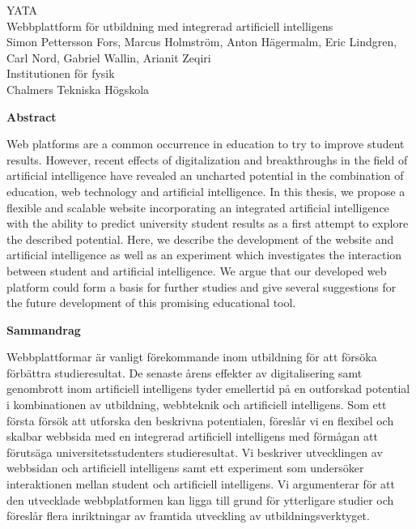 \noindent YATA\\
Webbplattform för utbildning med integrerad artificiell intelligens\\
Simon Pettersson Fors, Marcus Holmström, Anton Hägermalm, Eric Lindgren, Carl Nord, Gabriel Wallin, Arianit Zeqiri\\
Institutionen för fysik\\
Chalmers Tekniska Högskola\\


\vspace*{1cm}
\begin{flushleft}
    \Large
\noindent \textbf{Abstract}
\end{flushleft}



\noindent Web platforms are a common occurrence in education to try to improve student results. However, recent effects of digitalization and breakthroughs in the field of artificial intelligence have revealed an uncharted potential in the combination of education, web technology and artificial intelligence. In this thesis, we propose a flexible and scalable website incorporating an integrated artificial intelligence with the ability to predict university student results as a first attempt to explore the described potential. Here, we describe the development of the website and artificial intelligence as well as an experiment which investigates the interaction between student and artificial intelligence. We argue that our developed web platform could form a basis for further studies and give several suggestions for the future development of this promising educational tool. 

\vspace{2.5cm}
\begin{flushleft}
    \Large
\noindent \textbf{Sammandrag}
\end{flushleft}


\noindent Webbplattformar är vanligt förekommande inom utbildning för att försöka förbättra studieresultat. De senaste årens effekter av digitalisering samt genombrott inom artificiell intelligens tyder emellertid på en outforskad potential i kombinationen av utbildning, webbteknik och artificiell intelligens. Som ett första försök att utforska den beskrivna potentialen, föreslår vi en flexibel och skalbar webbsida med en integrerad artificiell intelligens med förmågan att förutsäga universitetsstudenters  studieresultat. Vi beskriver utvecklingen av webbsidan och artificiell intelligens samt ett experiment som undersöker interaktionen mellan student och artificiell intelligens. Vi argumenterar för att den utvecklade webbplatformen kan ligga till grund för ytterligare studier och föreslår flera inriktningar av framtida utveckling av utbildningsverktyget.



